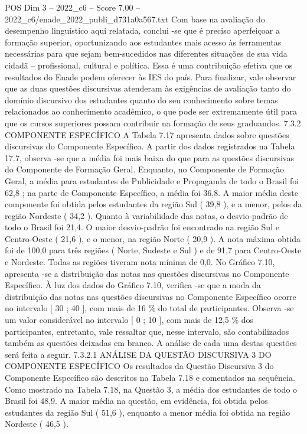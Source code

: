 \begin{textsample}{POS Dim 3 – 2022\_c6 – Score 7.00 – 2022\_c6/enade\_2022\_publi\_d731a0a567.txt}
Com base na avaliação do desempenho linguístico aqui relatada, conclui -se que é preciso aperfeiçoar a formação superior, oportunizando aos estudantes mais acesso às ferramentas necessárias para que sejam bem-sucedidos nas diferentes situações de sua vida cidadã – profissional, cultural e política.
Essa é uma contribuição efetiva que os resultados do Enade podem oferecer às IES do país.
Para finalizar, vale observar que as duas questões discursivas atenderam às exigências de avaliação tanto do domínio discursivo dos estudantes quanto do seu conhecimento sobre temas relacionados ao conhecimento acadêmico, o que pode ser extremamente útil para que os cursos superiores possam contribuir na formação de seus graduandos. 7.3.2 COMPONENTE ESPECÍFICO A Tabela 7.17 apresenta dados sobre questões discursivas do Componente Específico.
A partir dos dados registrados na Tabela 17.7, observa -se que a média foi mais baixa do que para as questões discursivas do Componente de Formação Geral.
Enquanto, no Componente de Formação Geral, a média para estudantes de Publicidade e Propaganda de todo o Brasil foi 62,8 ; na parte de Componente Específico, a média foi 36,8.
A maior média deste componente foi obtida pelos estudantes da região Sul ( 39,8 ), e a menor, pelos da região Nordeste ( 34,2 ).
Quanto à variabilidade das notas, o desvio-padrão de todo o Brasil foi 21,4.
O maior desvio-padrão foi encontrado na região Sul e Centro-Oeste ( 21,6 ), e o menor, na região Norte ( 20,9 ).
A nota máxima obtida foi de 100,0 para três regiões ( Norte, Sudeste e Sul ) e de 91,7 para Centro-Oeste e Nordeste.
Todas as regiões tiveram nota mínima de 0,0.
No Gráfico 7.10, apresenta -se a distribuição das notas nas questões discursivas no Componente Específico.
À luz dos dados do Gráfico 7.10, verifica -se que a moda da distribuição das notas nas questões discursivas no Componente Específico ocorre no intervalo [ 30 ; 40 ], com mais de 16 \% do total de participantes.
Observa -se um valor considerável no intervalo [ 0 ; 10 ], com mais de 12,5 \% dos participantes, entretanto, vale ressaltar que, nesse intervalo, são contabilizados também as questões deixadas em branco.
A análise de cada uma destas questões será feita a seguir. 7.3.2.1 ANÁLISE DA QUESTÃO DISCURSIVA 3 DO COMPONENTE ESPECÍFICO Os resultados da Questão Discursiva 3 do Componente Específico são descritos na Tabela 7.18 e comentados na sequência.
Como mostrado na Tabela 7.18, na Questão 3, a média dos estudantes de todo o Brasil foi 48,9.
A maior média na questão, em evidência, foi obtida pelos estudantes da região Sul ( 51,6 ), enquanto a menor média foi obtida na região Nordeste ( 46,5 ).

\end{textsample}
